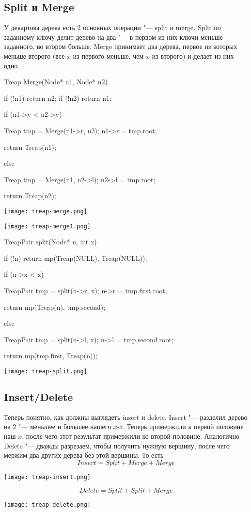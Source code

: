 \subsection{Split и Merge}

У декартова дерева есть 2 основных операции "--- split и merge.
Split по заданному ключу делит дерево на два "--- в первом из них ключи меньше заданного, во втором больше.
Merge принимает два дерева, первое из которых меньше второго (все $x$ из первого меньше, чем $x$ из второго) и делает из них одно.

\begin{cppcode}
Treap Merge(Node* n1, Node* n2) {
    if (!n1) {
        return n2;
    }
    if (!n2) {
        return n1;
    }

    if (n1->y < n2->y) {
        Treap tmp = Merge(n1->r, n2);
        n1->r = tmp.root;

        return Treap(n1);
    } else {
        Treap tmp = Merge(n1, n2->l);
        n2->l = tmp.root;

        return Treap(n2);
    }
}
\end{cppcode}

\begin{center} \texttt{[image: treap-merge.png]} \end{center}
\begin{center} \texttt{[image: treap-merge1.png]} \end{center}

\begin{cppcode}
TreapPair split(Node* n, int x) {
    if (!n) {
        return mp(Treap(NULL), Treap(NULL));
    }

    if (n->x < x) {
        TreapPair tmp = split(n->r, x);
        n->r = tmp.first.root;

        return mp(Treap(n), tmp.second);
    } else {
        TreapPair tmp = split(n->l, x);
        n->l = tmp.second.root;

        return mp(tmp.first, Treap(n));
    }
}
\end{cppcode}

\begin{center} \texttt{[image: treap-split.png]} \end{center}

\subsection{Insert/Delete}

Теперь понятно, как должны выглядеть insert и delete.
Insert "--- разделил дерево на 2 "--- меньшее и большее нашего $x$-a.
Теперь примержили к первой половине наш $x$, после чего этот результат примержили ко второй половине.
Аналогично Delete "--- дважды разрезаем, чтобы получить нужную вершину, после чего мержим два других дерева без этой вершины.
То есть
\[ Insert = Split + Merge + Merge \]
\begin{center} \texttt{[image: treap-insert.png]} \end{center}
\[ Delete = Split + Split + Merge \]
\begin{center} \texttt{[image: treap-delete.png]} \end{center}

